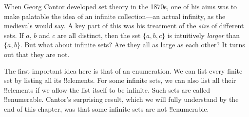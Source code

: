 \documentclass[../../../include/open-logic-section]{subfiles}
\begin{document}

When Georg Cantor developed set theory in the 1870s, one of his aims
was to make palatable the idea of an infinite collection---an actual
infinity, as the medievals would say.  A key part of this was his
treatment of the \emph{size} of different sets. If $a$, $b$ and $c$ are
all distinct, then the set $\{a, b, c\}$ is intuitively \emph{larger}
than $\{a, b\}$. But what about infinite sets? Are they all as large
as each other? It turns out that they are not.

The first important idea here is that of an enumeration.  We can
list every finite set by listing all its !!{element}s.  For some
infinite sets, we can also list all their !!{element}s if we allow the
list itself to be infinite. Such sets are called !!{enumerable}.
Cantor's surprising result, which we will fully understand by the end
of this chapter, was that some infinite sets are not !!{enumerable}.
\end{document}

